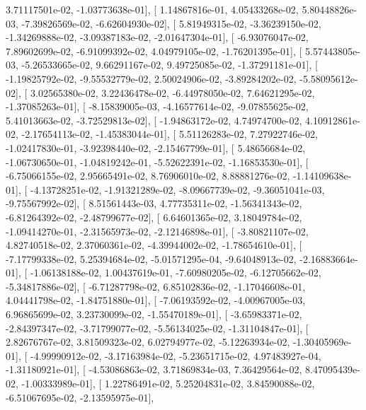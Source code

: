 \documentclass{article}
\begin{document}
          3.71117501e-02,  -1.03773638e-01],
       [  1.14867816e-01,   4.05433268e-02,   5.80448826e-03,
         -7.39826569e-02,  -6.62604930e-02],
       [  5.81949315e-02,  -3.36239150e-02,  -1.34269888e-02,
         -3.09387183e-02,  -2.01647304e-01],
       [ -6.93076047e-02,   7.89602699e-02,  -6.91099392e-02,
          4.04979105e-02,  -1.76201395e-01],
       [  5.57443805e-03,  -5.26533665e-02,   9.66291167e-02,
          9.49725085e-02,  -1.37291181e-01],
       [ -1.19825792e-02,  -9.55532779e-02,   2.50024906e-02,
         -3.89284202e-02,  -5.58095612e-02],
       [  3.02565380e-02,   3.22436478e-02,  -6.44978050e-02,
          7.64621295e-02,  -1.37085263e-01],
       [ -8.15839005e-03,  -4.16577614e-02,  -9.07855625e-02,
          5.41013663e-02,  -3.72529813e-02],
       [ -1.94863172e-02,   4.74974700e-02,   4.10912861e-02,
         -2.17654113e-02,  -1.45383044e-01],
       [  5.51126283e-02,   7.27922746e-02,  -1.02417830e-01,
         -3.92398440e-02,  -2.15467799e-01],
       [  5.48656684e-02,  -1.06730650e-01,  -1.04819242e-01,
         -5.52622391e-02,  -1.16853530e-01],
       [ -6.75066155e-02,   2.95665491e-02,   8.76906010e-02,
          8.88881276e-02,  -1.14109638e-01],
       [ -4.13728251e-02,  -1.91321289e-02,  -8.09667739e-02,
         -9.36051041e-03,  -9.75567992e-02],
       [  8.51561443e-03,   4.77735311e-02,  -1.56341343e-02,
         -6.81264392e-02,  -2.48799677e-02],
       [  6.64601365e-02,   3.18049784e-02,  -1.09414270e-01,
         -2.31565973e-02,  -2.12146898e-01],
       [ -3.80821107e-02,   4.82740518e-02,   2.37060361e-02,
         -4.39944002e-02,  -1.78654610e-01],
       [ -7.17799338e-02,   5.25394684e-02,  -5.01571295e-04,
         -9.64048913e-02,  -2.16883664e-01],
       [ -1.06138188e-02,   1.00437619e-01,  -7.60980205e-02,
         -6.12705662e-02,  -5.34817886e-02],
       [ -6.71287798e-02,   6.85102836e-02,  -1.17046608e-01,
          4.04441798e-02,  -1.84751880e-01],
       [ -7.06193592e-02,  -4.00967005e-03,   6.96865699e-02,
          3.23730099e-02,  -1.55470189e-01],
       [ -3.65983371e-02,  -2.84397347e-02,  -3.71799077e-02,
         -5.56134025e-02,  -1.31104847e-01],
       [  2.82676767e-02,   3.81509323e-02,   6.02794977e-02,
         -5.12263934e-02,  -1.30405969e-01],
       [ -4.99990912e-02,  -3.17163984e-02,  -5.23651715e-02,
          4.97483927e-04,  -1.31180921e-01],
       [ -4.53086863e-02,   3.71869834e-03,   7.36429564e-02,
          8.47095439e-02,  -1.00333989e-01],
       [  1.22786491e-02,   5.25204831e-02,   3.84590088e-02,
         -6.51067695e-02,  -2.13595975e-01],
\end{document}

